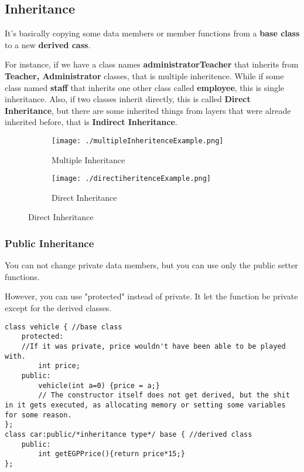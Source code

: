 \documentclass{article}
\begin{document}
\newpage	

\subsection{Inheritance}
It's basically copying some data members or member functions from a \textbf{base class} to a new \textbf{derived cass}. 

For instance, if we have a class names \textbf{administratorTeacher} that inherits from \textbf{Teacher, Administrator} classes, that is multiple inheritence. While if some class named \textbf{staff} that inherits one other class called \textbf{employee}, this is single inheritance. Also, if two classes inherit directly, this is called \textbf{Direct Inheritance}, but there are some inherited things from layers that were alreade inherited before, that is \textbf{Indirect Inheritance}.

\begin{figure}[h]
	\begin{subfigure}[b]{0.5\linewidth}
			\texttt{[image: ./multipleInheritenceExample.png]}
			\caption{Multiple Inheritance}
			\label{inherit:tokhy_1}
		\end{subfigure}
		\begin{subfigure}[b]{0.4\linewidth}
			\texttt{[image: ./directiheritenceExample.png]}
			\caption{Direct Inheritance}
			\label{inherit:tokhy_2}
		\end{subfigure}
			
\end{figure}

\subsubsection{Public Inheritance}
You can not change private data members, but you can use only the public setter functions.

However, you can use "protected" instead of private. It let the function be private except for the derived classes.

\begin{lstlisting}
class vehicle { //base class
	protected:
	//If it was private, price wouldn't have been able to be played with.
		int price; 
	public:
		vehicle(int a=0) {price = a;}
		// The constructor itself does not get derived, but the shit in it gets executed, as allocating memory or setting some variables for some reason.
};
class car:public/*inheritance type*/ base { //derived class
	public:
		int getEGPPrice(){return price*15;}
};
\end{lstlisting}
\end{document}
